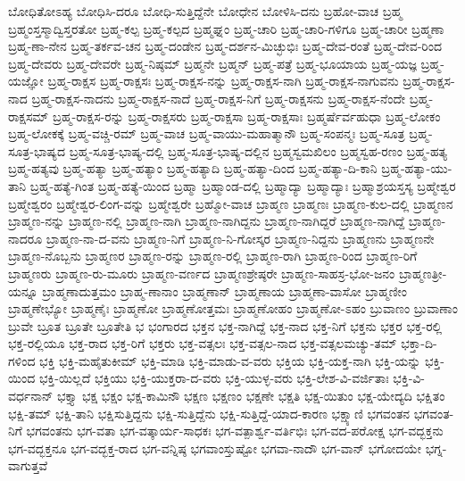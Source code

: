 {ಬೋಧಿತೋಽಹ್ಯ
ಬೋಧಿಸಿ-ದರೂ
ಬೋಧಿ-ಸುತ್ತಿದ್ದೆನೇ
ಬೋಧೇನ
ಬೋಳಿಸಿ-ದನು
ಬ್ರಹೋ-ವಾಚ
ಬ್ರಹ್ಮ
ಬ್ರಹ್ಮಂಸ್ತಸ್ಮಾದ್ವಿಸ್ತರತೋ
ಬ್ರಹ್ಮ-ಕಲ್ಪ
ಬ್ರಹ್ಮ-ಕಲ್ಪದ
ಬ್ರಹ್ಮಘ್ನಂ
ಬ್ರಹ್ಮ-ಚಾರಿ
ಬ್ರಹ್ಮ-ಚಾರಿ-ಗಳಿಗೂ
ಬ್ರಹ್ಮ-ಚಾರೀ
ಬ್ರಹ್ಮಣಾ
ಬ್ರಹ್ಮ-ಣಾ-ನೇನ
ಬ್ರಹ್ಮ-ತರ್ಕವ-ಚನ
ಬ್ರಹ್ಮ-ದಂಡೇನ
ಬ್ರಹ್ಮ-ದರ್ಶನ-ಮಿಚ್ಛುಭಿಃ
ಬ್ರಹ್ಮ-ದೇವ-ರಂತೆ
ಬ್ರಹ್ಮ-ದೇವ-ರಿಂದ
ಬ್ರಹ್ಮ-ದೇವರು
ಬ್ರಹ್ಮ-ದೇವರೇ
ಬ್ರಹ್ಮ-ನಿಷ್ಠಮ್
ಬ್ರಹ್ಮನೇ
ಬ್ರಹ್ಮನ್
ಬ್ರಹ್ಮ-ಪತ್ರೆ
ಬ್ರಹ್ಮ-ಭೂಯಾಯ
ಬ್ರಹ್ಮ-ಯಜ್ಞ
ಬ್ರಹ್ಮ-ಯಜ್ಞೋ
ಬ್ರಹ್ಮ-ರಾಕ್ಷಸ
ಬ್ರಹ್ಮ-ರಾಕ್ಷಸಃ
ಬ್ರಹ್ಮ-ರಾಕ್ಷಸ-ನನ್ನು
ಬ್ರಹ್ಮ-ರಾಕ್ಷಸ-ನಾಗಿ
ಬ್ರಹ್ಮ-ರಾಕ್ಷಸ-ನಾಗುವನು
ಬ್ರಹ್ಮ-ರಾಕ್ಷಸ-ನಾದ
ಬ್ರಹ್ಮ-ರಾಕ್ಷಸ-ನಾದನು
ಬ್ರಹ್ಮ-ರಾಕ್ಷಸ-ನಾದೆ
ಬ್ರಹ್ಮ-ರಾಕ್ಷಸ-ನಿಗೆ
ಬ್ರಹ್ಮ-ರಾಕ್ಷಸನು
ಬ್ರಹ್ಮ-ರಾಕ್ಷಸ-ನೆಂದೇ
ಬ್ರಹ್ಮ-ರಾಕ್ಷಸಮ್
ಬ್ರಹ್ಮ-ರಾಕ್ಷಸ-ರನ್ನು
ಬ್ರಹ್ಮ-ರಾಕ್ಷಸರು
ಬ್ರಹ್ಮ-ರಾಕ್ಷಸಾ
ಬ್ರಹ್ಮ-ರಾಕ್ಷಸಾಃ
ಬ್ರಹ್ಮರ್ಷೆರ್ವಹುಧಾ
ಬ್ರಹ್ಮ-ಲೋಕಂ
ಬ್ರಹ್ಮ-ಲೋಕಕ್ಕೆ
ಬ್ರಹ್ಮ-ವಚ್ಚಿ-ರಮ್
ಬ್ರಹ್ಮ-ವಾಚ
ಬ್ರಹ್ಮ-ವಾಯು-ಮಹಾತ್ಮಾನೌ
ಬ್ರಹ್ಮ-ಸಂಪನ್ಮಃ
ಬ್ರಹ್ಮ-ಸೂತ್ರ
ಬ್ರಹ್ಮ-ಸೂತ್ರ-ಭಾಷ್ಯದ
ಬ್ರಹ್ಮ-ಸೂತ್ರ-ಭಾಷ್ಯ-ದಲ್ಲಿ
ಬ್ರಹ್ಮ-ಸೂತ್ರ-ಭಾಷ್ಯ-ದಲ್ಲಿನ
ಬ್ರಹ್ಮಸ್ವಮಖಿಲಂ
ಬ್ರಹ್ಮಸ್ವಹ-ರಣಂ
ಬ್ರಹ್ಮ-ಹತ್ಯ
ಬ್ರಹ್ಮ-ಹತ್ಯವು
ಬ್ರಹ್ಮ-ಹತ್ಯಾ
ಬ್ರಹ್ಮ-ಹತ್ಯಾಂ
ಬ್ರಹ್ಮ-ಹತ್ಯಾದಿ
ಬ್ರಹ್ಮ-ಹತ್ಯಾ-ದಿಂದ
ಬ್ರಹ್ಮ-ಹತ್ಯಾ-ದಿ-ಕಾನಿ
ಬ್ರಹ್ಮ-ಹತ್ಯಾ-ಯು-ತಾನಿ
ಬ್ರಹ್ಮ-ಹತ್ಯೆ-ಗಿಂತ
ಬ್ರಹ್ಮ-ಹತ್ಯೆ-ಯಿಂದ
ಬ್ರಹ್ಮಾ
ಬ್ರಹ್ಮಾಂಡ-ದಲ್ಲಿ
ಬ್ರಹ್ಮಾದ್ಯಾ
ಬ್ರಹ್ಮಾದ್ಯಾಃ
ಬ್ರಹ್ಮಾಶ್ರಯಸ್ತಸ್ಯ
ಬ್ರಹ್ಮೇಶ್ವರ
ಬ್ರಹ್ಮೇಶ್ವರಂ
ಬ್ರಹ್ಮೇಶ್ವರ-ಲಿಂಗ-ವನ್ನು
ಬ್ರಹ್ಮೇಶ್ವರೇ
ಬ್ರಹ್ಮೋ-ವಾಚ
ಬ್ರಾಹ್ಮಣ
ಬ್ರಾಹ್ಮಣಃ
ಬ್ರಾಹ್ಮಣ-ಕುಲ-ದಲ್ಲಿ
ಬ್ರಾಹ್ಮಣನ
ಬ್ರಾಹ್ಮಣ-ನನ್ನು
ಬ್ರಾಹ್ಮಣ-ನಲ್ಲಿ
ಬ್ರಾಹ್ಮಣ-ನಾಗಿ
ಬ್ರಾಹ್ಮಣ-ನಾಗಿದ್ದನು
ಬ್ರಾಹ್ಮಣ-ನಾಗಿದ್ದರೆ
ಬ್ರಾಹ್ಮಣ-ನಾಗಿದ್ದೆ
ಬ್ರಾಹ್ಮಣ-ನಾದರೂ
ಬ್ರಾಹ್ಮಣ-ನಾ-ದ-ವನು
ಬ್ರಾಹ್ಮಣ-ನಿಗೆ
ಬ್ರಾಹ್ಮಣ-ನಿ-ಗೋಸ್ಕರ
ಬ್ರಾಹ್ಮಣ-ನಿದ್ದನು
ಬ್ರಾಹ್ಮಣನು
ಬ್ರಾಹ್ಮಣನೇ
ಬ್ರಾಹ್ಮಣ-ನೊಬ್ಬನು
ಬ್ರಾಹ್ಮಣರ
ಬ್ರಾಹ್ಮಣ-ರನ್ನು
ಬ್ರಾಹ್ಮಣ-ರಲ್ಲಿ
ಬ್ರಾಹ್ಮಣ-ರಾಗಿ
ಬ್ರಾಹ್ಮಣ-ರಿಂದ
ಬ್ರಾಹ್ಮಣ-ರಿಗೆ
ಬ್ರಾಹ್ಮಣರು
ಬ್ರಾಹ್ಮಣ-ರು-ಮೂರು
ಬ್ರಾಹ್ಮಣ-ವರ್ಣದ
ಬ್ರಾಹ್ಮಣಶ್ರೇಷ್ಠರೇ
ಬ್ರಾಹ್ಮಣ-ಸಾಹಸ್ರ-ಭೋ-ಜನಂ
ಬ್ರಾಹ್ಮಣತ್ರೀ-ಯನ್ನೂ
ಬ್ರಾಹ್ಮಣಾದುತ್ತಮಂ
ಬ್ರಾಹ್ಮ-ಣಾನಾಂ
ಬ್ರಾಹ್ಮಣಾನ್
ಬ್ರಾಹ್ಮಣಾಯ
ಬ್ರಾಹ್ಮಣಾ-ವಾಸೋ
ಬ್ರಾಹ್ಮಣೀಂ
ಬ್ರಾಹ್ಮಣೇಭ್ಯೋ
ಬ್ರಾಹ್ಮಣೈಃ
ಬ್ರಾಹ್ಮಣೋ
ಬ್ರಾಹ್ಮಣೋತ್ತಮಃ
ಬ್ರಾಹ್ಮಣೋಹಂ
ಬ್ರಾಹ್ಮಣೋ-ಽಹಂ
ಬ್ರುವಾಣಂ
ಬ್ರುವಾಣಾಂ
ಬ್ರುವೇ
ಬ್ರೂತ
ಬ್ರೂತೇ
ಬ್ರೂತೇತಿ
ಭ
ಭಂಗಾರದ
ಭಕ್ತನ
ಭಕ್ತ-ನಾಗಿದ್ದೆ
ಭಕ್ತ-ನಾದ
ಭಕ್ತ-ನಿಗೆ
ಭಕ್ತನು
ಭಕ್ತರ
ಭಕ್ತ-ರಲ್ಲಿ
ಭಕ್ತ-ರಲ್ಲಿಯೂ
ಭಕ್ತ-ರಾದ
ಭಕ್ತ-ರಿಗೆ
ಭಕ್ತರು
ಭಕ್ತ-ವತ್ಸಲಃ
ಭಕ್ತ-ವತ್ಸಲ-ನಾದ
ಭಕ್ತ-ವತ್ಸಲಮಚ್ಯು-ತಮ್
ಭಕ್ತಾ-ದಿ-ಗಳಿಂದ
ಭಕ್ತಿ
ಭಕ್ತಿ-ಮಹೈತುಕೀಮ್
ಭಕ್ತಿ-ಮಾಡಿ
ಭಕ್ತಿ-ಮಾಡು-ವ-ವರು
ಭಕ್ತಿಯ
ಭಕ್ತಿ-ಯಕ್ತ-ನಾಗಿ
ಭಕ್ತಿ-ಯನ್ನು
ಭಕ್ತಿ-ಯಿಂದ
ಭಕ್ತಿ-ಯಿಲ್ಲದೆ
ಭಕ್ತಿಯು
ಭಕ್ತಿ-ಯುಕ್ತರಾ-ದ-ವರು
ಭಕ್ತಿ-ಯುಳ್ಳ-ವರು
ಭಕ್ತಿ-ಲೇಶ-ವಿ-ವರ್ಜಿತಾಃ
ಭಕ್ತಿ-ವಿ-ವರ್ಧನಾನ್
ಭಕ್ತ್ಯಾ
ಭಕ್ಷ
ಭಕ್ಷಂ
ಭಕ್ಷ-ಕಾಮಿನೌ
ಭಕ್ಷಣ
ಭಕ್ಷಣಂ
ಭಕ್ಷಣೇ
ಭಕ್ಷತಿ
ಭಕ್ಷ-ಯಿತುಂ
ಭಕ್ಷ-ಯೇದ್ಯದಿ
ಭಕ್ಷಿತಂ
ಭಕ್ಷಿ-ತಮ್
ಭಕ್ಷಿ-ತಾನಿ
ಭಕ್ಷಿಸುತ್ತಿದ್ದನು
ಭಕ್ಷಿ-ಸುತ್ತಿದ್ದೆನು
ಭಕ್ಷಿ-ಸುತ್ತಿದ್ದೆ-ಯಾದ-ಕಾರಣ
ಭಕ್ಷ್ಯಾಣಿ
ಭಗವಂತನ
ಭಗವಂತ-ನಿಗೆ
ಭಗವಂತನು
ಭಗ-ವತಾ
ಭಗ-ವತ್ಕಾರ್ಯ-ಸಾಧಕಃ
ಭಗ-ವತ್ಪಾರ್ಶ್ವ-ವರ್ತಿಭಿಃ
ಭಗ-ವದ-ಪರೋಕ್ಷ
ಭಗ-ವದ್ಭಕ್ತನು
ಭಗ-ವದ್ಭಕ್ತನೂ
ಭಗ-ವದ್ಭಕ್ತ-ರಾದ
ಭಗ-ವನ್ನಿಷ್ಠ
ಭಗವಾಂಸ್ತುಷ್ಟೋ
ಭಗವಾ-ನಾದೌ
ಭಗ-ವಾನ್
ಭಗೋದಯೇ
ಭಗ್ನ-ವಾಗುತ್ತವೆ
}
